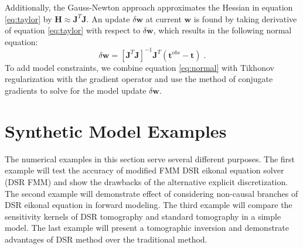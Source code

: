 Additionally, the Gauss-Newton approach approximates the Hessian in equation \ref{eq:taylor} by 
$\mathbf{H} \approx \mathbf{J}^T \mathbf{J}$. An update $\delta \mathbf{w}$ at current $\mathbf{w}$ is found by 
taking derivative of equation \ref{eq:taylor} with respect to $\delta \mathbf{w}$, which results in the 
following normal equation:
\begin{equation}
\label{eq:normal}
\delta \mathbf{w} = \left[ \mathbf{J}^T \mathbf{J} \right]^{-1} \mathbf{J}^T (\mathbf{t}^{obs} - \mathbf{t})\;.
\end{equation}
To add model constraints, we combine equation \ref{eq:normal} with Tikhonov regularization \cite[]{tikhonov} 
with the gradient operator and use the method of conjugate gradients \cite[]{hestenes} to solve for the model 
update $\delta \mathbf{w}$.

\section{Synthetic Model Examples}

The numerical examples in this section serve several different purposes. 
The first example will test the accuracy of modified FMM DSR eikonal equation solver (DSR FMM) and show 
the drawbacks of the alternative explicit discretization. The second example will demonstrate effect of 
considering non-causal branches of DSR eikonal equation in forward modeling. The third 
example will compare the sensitivity kernels of DSR tomography and standard tomography in a 
simple model. The last example will present a tomographic inversion 
and demonstrate advantages of DSR method over the traditional method.

